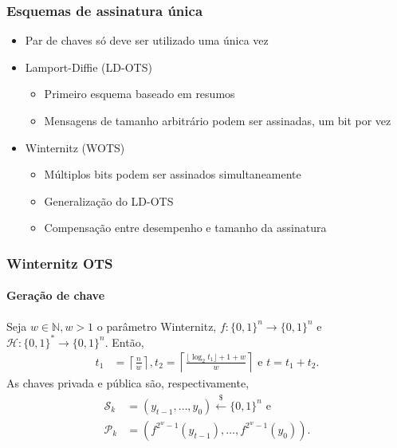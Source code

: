 \documentclass[12pt]{beamer}
\newcommand{\pk}{\mathcal{P}_k}
\newcommand{\sk}{\mathcal{S}_k}
\newcommand{\binwds}[1]{\{0, 1\}^{#1}}
\begin{document}
\begin{frame}
  \frametitle{Esquemas de assinatura única}
  \begin{itemize}
    \item Par de chaves só deve ser utilizado uma única vez
    \item Lamport-Diffie (LD-OTS)
    \begin{itemize}
      \item Primeiro esquema baseado em resumos
      \item Mensagens de tamanho arbitrário podem ser assinadas, um bit por vez
    \end{itemize}
    \item Winternitz (WOTS)
    \begin{itemize}
      \item Múltiplos bits podem ser assinados simultaneamente
      \item Generalização do LD-OTS
      \item Compensação entre desempenho e tamanho da assinatura
    \end{itemize}
  \end{itemize}
\end{frame}

\begin{frame}
  \frametitle{Winternitz OTS}
  \framesubtitle{Geração de chave}
  Seja $w \in \mathbb{N}, w > 1$ o parâmetro Winternitz, $f : \binwds{n}
    \longrightarrow \binwds{n}$ e $\mathcal{H} : \binwds{*} \longrightarrow
    \binwds{n}$. Então,
  \begin{align*}
    t_1 &= \left\lceil \frac{n}{w} \right\rceil,
    t_2 = \left\lceil \frac{\lfloor \log_2 t_1 \rfloor + 1 + w}{w} \right\rceil
    \text{ e } t = t_1 + t_2.
  \end{align*}
  As chaves privada e pública são, respectivamente,
  \begin{align*}
    \sk{} &= (y_{t - 1}, \dots, y_{0}) \stackrel{\$}{\longleftarrow} \binwds{n}
      \text{ e} \\
    \pk{} &= (f^{2^w - 1}(y_{t - 1}), \dots, f^{2^w - 1}(y_0)).
  \end{align*}
\end{frame}
\end{document}
